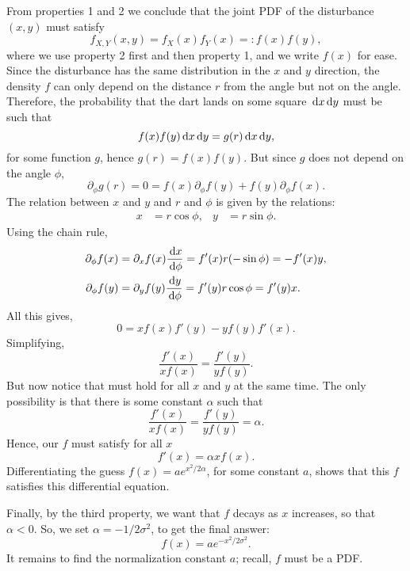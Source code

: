 \begin{exercise}
\begin{solution}
From properties 1 and 2 we conclude that the joint PDF of the disturbance $(x,y)$ must satisfy
\begin{equation}
  \label{eq:1}
  f_{X,Y}(x,y) = f_X(x)f_Y(x) =: f(x)f(y),
\end{equation}
where we use property 2 first and then property 1, and we write $f(x)$ for ease.
Since the disturbance has the same distribution in the $x$ and $y$ direction, the density $f$ can only depend on the distance $r$ from the angle but not on the angle. Therefore, the probability that the dart lands on some square $\,\textrm{d}x\,\textrm{d}y$ must be such that
\begin{equation}
  \label{eq:4}
  f(x)f(y) \,\textrm{d}x \,\textrm{d}y = g(r) \,\textrm{d}x \,\textrm{d}y,
\end{equation}
for some function $g$, hence $g(r) = f(x)f(y)$. But since $g$ does not depend on the angle $\phi$,
\begin{equation}
\label{eq:5}
\partial_{\phi} g(r) = 0 = f(x) \partial_{\phi}f(y) + f(y) \partial_{\phi}f(x).
\end{equation}
The relation between $x$ and $y$ and $r$ and $\phi$ is given by the relations:
\begin{align}
\label{eq:6}
x &= r \cos \phi, & y&=r\sin \phi.
\end{align}
Using the chain rule,
\begin{align}
  \label{eq:7}
  \partial_{\phi} f(x) &= \partial_{x} f(x) \frac{\,\textrm{d}x}{\,\textrm{d}\phi} = f'(x) r (-\sin \phi) = - f'(x) y, \\
  \partial_{\phi} f(y) &= \partial_{y} f(y) \frac{\,\textrm{d}y}{\,\textrm{d}\phi} = f'(y) r \cos \phi =  f'(y) x.
\end{align}
All this gives,
\begin{equation}
\label{eq:8}
0 = x f(x) f'(y) - y f(y)f'(x).
\end{equation}
Simplifying,
\begin{equation}
  \label{eq:9}
   \frac{f'(x)}{x f(x)} = \frac{f'(y)}{ y f(y)}.
\end{equation}
But now notice that must hold for all $x$ and $y$ at the same time. The only possibility is that there is some constant $\alpha$ such that
\begin{equation}
\label{eq:10}
   \frac{f'(x)}{x f(x)} =  \frac{f'(y)}{y f(y)} = \alpha.
\end{equation}
Hence, our $f$ must satisfy for all $x$
\begin{equation}
\label{eq:11}
f'(x) = \alpha x f(x).
\end{equation}
Differentiating the guess $f(x) = a e^{ x^2/{2 \alpha}}$, for some constant $a$, shows that this $f$ satisfies this differential equation.

Finally, by the third property, we want that $f$ decays as  $x$ increases, so that $\alpha<0$. So, we set $\alpha = -1/2\sigma^{2}$, to get the final answer:
\begin{equation}
  \label{eq:12}
  f(x) = a e^{-x^{2}/2 \sigma^{2}}.
\end{equation}
It remains to find the normalization constant $a$; recall, $f$ must be a PDF.
\end{solution}
\end{exercise}

